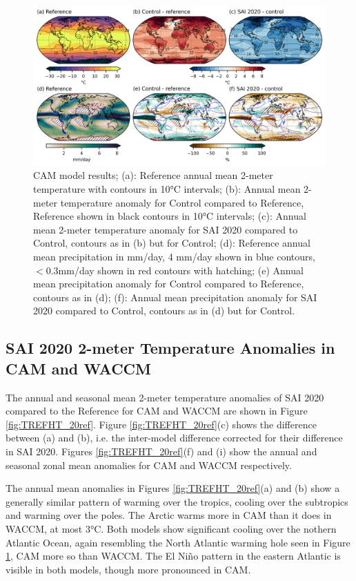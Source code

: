 \begin{figure}[H]
	\centering
	\includegraphics[width=0.95\linewidth]{images/CAM_scens.png}
	\caption{CAM model results; (a): Reference annual mean 2-meter temperature with contours in 10°C intervals; (b): Annual mean 2-meter temperature anomaly for Control compared to Reference, Reference shown in black contours in 10°C intervals; (c): Annual mean 2-meter temperature anomaly for SAI 2020 compared to Control, contours as in (b) but for Control; (d): Reference annual mean precipitation in mm/day, 4 mm/day shown in blue contours, $<0.3$mm/day shown in red contours with hatching; (e) Annual mean precipitation anomaly for Control compared to Reference, contours as in (d); (f): Annual mean precipitation anomaly for SAI 2020 compared to Control, contours as in (d) but for Control.}
	\label{fig:CAM_scens}
\end{figure}


\subsection{SAI 2020 2-meter Temperature Anomalies in CAM and WACCM}
The annual and seasonal mean 2-meter temperature anomalies of SAI 2020 compared to the Reference for CAM and WACCM are shown in Figure \ref{fig:TREFHT_20ref}. Figure \ref{fig:TREFHT_20ref}(c) shows the difference between (a) and (b), i.e. the inter-model difference corrected for their difference in SAI 2020. Figures \ref{fig:TREFHT_20ref}(f) and (i) show the annual and seasonal zonal mean anomalies for CAM and WACCM respectively. 

The annual mean anomalies in Figures \ref{fig:TREFHT_20ref}(a) and (b) show a generally similar pattern of warming over the tropics, cooling over the subtropics and warming over the poles. The Arctic warms more in CAM than it does in WACCM, at most 3°C. Both models show significant cooling over the nothern Atlantic Ocean, again resembling the North Atlantic warming hole seen in Figure \ref{fig:CAM_scens}, CAM more so than WACCM. The El Ni\~no pattern in the eastern Atlantic is visible in both models, though more pronounced in CAM. 

